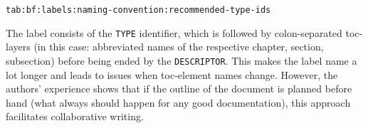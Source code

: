 		\begin{center}
			\lstinline$tab:bf:labels:naming-convention:recommended-type-ids$
		\end{center}
		\vspace{-0.25cm}
		The label consists of the \lstinline$TYPE$ identifier, which is followed by colon-separated toc-layers (in this case: abbreviated names of the respective chapter, section, subsection) before being ended by the \lstinline$DESCRIPTOR$. This makes the label name a lot longer and leads to issues when toc-element names change. However, the authors' experience shows that if the outline of the document is planned before hand (what always should happen for any good documentation), this approach facilitates collaborative writing.  